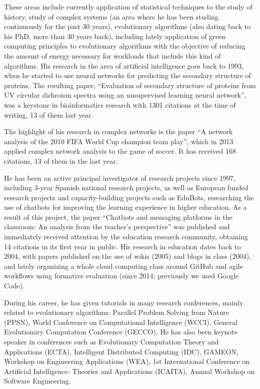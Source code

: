 \documentclass[a4paper]{article}
\begin{document}
These areas include currently application of statistical techniques to the study of history, study of complex systems (an area where he has been studing continuously for the past 30 years), evolutionary algorithms (also dating back to his PhD, more than 30 years back), including lately application of green computing principles to evolutionary algorithms with the objective of reducing the amount of energy necessary for workloads that include this kind of algorithms. His research in the area of artificial intelligence goes back to 1993, when he started to use neural networks for predicting the secondary structure of proteins. The resulting paper, ``Evaluation of secondary structure of proteins from UV circular dichroism spectra using an unsupervised learning neural network'', was a keystone in bioinformatics research with 1301 citations at the time of writing, 13 of them last year.

The highlight of his research in complex networks is the paper ``A network analysis of the 2010 FIFA World Cup champion team play'', which in 2013 applied complex network analysis to the game of soccer. It has received 168 citations, 13 of them in the last year.

He has been an active principal investigator of research projects since 1997,
including 3-year Spanish national research projects, as well as European funded
research projects and capacity-building projects such as EduBots, researching
the use of chatbots for improving the learning experience in higher
education. As a result of this project, the paper ``Chatbots and messaging
platforms in the classroom: An analysis from the teacher’s perspective'' was
published and immediately received attention by the education research
community, obtaining 14 citations in its first year in public. His research in
education dates back to 2004, with papers published on the use of wikis (2005) and
blogs in class (2004), and lately organizing a whole cloud computing class around
GitHub and agile workflows using formative evaluation (since 2014; previously we
used Google Code).

During his career, he has given tutorials in many research conferences, mainly
related to evolutionary algorithms: Parallel Problem Solving from Nature (PPSN),
World Conference on Computational Intelligence (WCCI), General Evolutionary
Computation Conference (GECCO). He has also been keynote speaker in conferences
such as Evolutionary Computation Theory and Applications (ECTA), Intelligent
Distributed Computing (IDC), GAMEON, Workshop on Engineering Applications (WEA),
1st International Conference on Artificial Intelligence: Theories and
Applications (ICAITA), Annual Workshop on Software Engineering.
\end{document}
